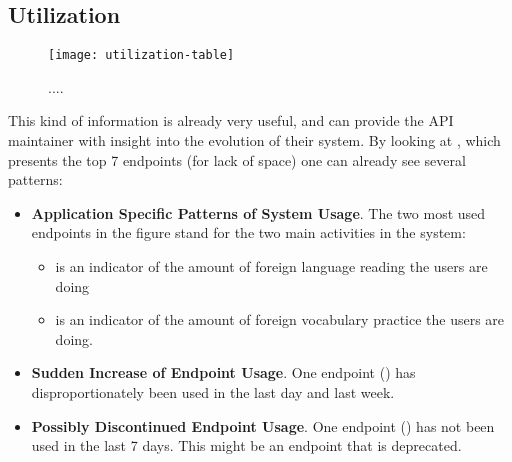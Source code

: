 

\newpage
\subsection{Utilization}
\label{sec:util}




  \begin{figure}[h!]
  \centering
  \texttt{[image: utilization-table]}
  \caption{....}
  \label{fig:basicest}
  \end{figure}

This kind of information is already very useful, and can provide the API maintainer with insight into the evolution of their system. By looking at , which presents the top 7 endpoints (for lack of space) one can already see several patterns: 

\begin{itemize}

  \item {\bf Application Specific Patterns of System Usage}. The two most used endpoints in the figure stand for the two main activities in the system: 

  \begin{itemize}

    \item \epTranslationsColor is an indicator of the amount of foreign language reading the users are doing

    \item \epOutcomeColor is an indicator of the amount of foreign vocabulary practice the users are doing.

  \end{itemize}

  \item {\bf Sudden Increase of Endpoint Usage}. One endpoint (\epUserActivityColor) has disproportionately been used in the last day and last week. 

  \item {\bf Possibly Discontinued Endpoint Usage}. One endpoint (\epFeedItemsColor) has not been used in the last 7 days. This might be an endpoint that is deprecated.

\end{itemize}

